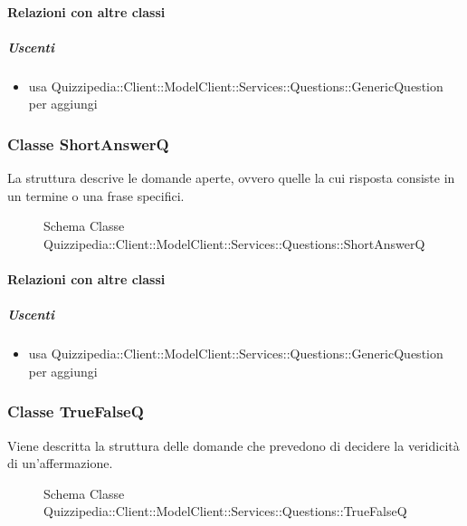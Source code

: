 \paragraph{Relazioni con altre classi}
\subparagraph{Uscenti}
\begin{itemize}
\item usa Quizzipedia::Client::ModelClient::Services::Questions::GenericQuestion per aggiungi
\end{itemize}
\subsubsection{Classe ShortAnswerQ}
La struttura descrive le domande aperte, ovvero quelle la cui risposta consiste in un termine o una frase specifici.
\begin{figure}[H]
\centering
\noindent{}
\caption[Schema Classe ShortAnswerQ]{Schema Classe Quizzipedia::Client::ModelClient::Services::Questions::ShortAnswerQ}
\end{figure}
\paragraph{Relazioni con altre classi}
\subparagraph{Uscenti}
\begin{itemize}
\item usa Quizzipedia::Client::ModelClient::Services::Questions::GenericQuestion per aggiungi
\end{itemize}
\subsubsection{Classe TrueFalseQ}
Viene descritta la struttura delle domande che prevedono di decidere la veridicità di un'affermazione.
\begin{figure}[H]
\centering
\noindent{}
\caption[Schema Classe TrueFalseQ]{Schema Classe Quizzipedia::Client::ModelClient::Services::Questions::TrueFalseQ}
\end{figure}
